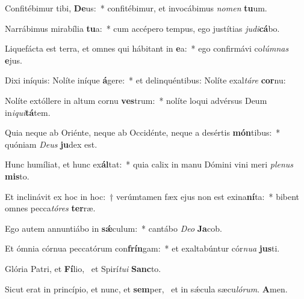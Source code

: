 \item Confitébimur tibi, \textbf{De}us:~* confitébimur, et invocábimus \textit{no}\textit{men} \textbf{tu}um.
\item Narrábimus mirabília \textbf{tu}a:~* cum accépero tempus, ego justítias \textit{ju}\textit{di}\textbf{cá}bo.
\item Liquefácta est terra, et omnes qui hábitant in \textbf{e}a:~* ego confirmávi co\textit{lúm}\textit{nas} \textbf{e}jus.
\item Dixi iníquis: Nolíte iníque \textbf{á}gere:~* et delinquéntibus: Nolíte exal\textit{tá}\textit{re} \textbf{cor}nu:
\item Nolíte extóllere in altum cornu \textbf{ves}trum:~* nolíte loqui advérsus Deum in\textit{i}\textit{qui}\textbf{tá}tem.
\item Quia neque ab Oriénte, neque ab Occidénte, neque a desértis \textbf{món}tibus:~* quóniam \textit{De}\textit{us} \textbf{ju}dex est.
\item Hunc humíliat, et hunc ex\textbf{ál}tat:~* quia calix in manu Dómini vini meri \textit{ple}\textit{nus} \textbf{mis}to.
\item Et inclinávit ex hoc in hoc:~† verúmtamen fæx ejus non est exina\textbf{ní}ta:~* bibent omnes pecca\textit{tó}\textit{res} \textbf{ter}ræ.
\item Ego autem annuntiábo in \textbf{sǽ}culum:~* cantábo \textit{De}\textit{o} \textbf{Ja}cob.
\item Et ómnia córnua peccatórum con\textbf{frín}gam:~* et exaltabúntur cór\textit{nu}\textit{a} \textbf{jus}ti.
\item Glória Patri, et \textbf{Fí}lio,~\psstar{} et Spirí\textit{tu}\textit{i} \textbf{Sanc}to.
\item Sicut erat in princípio, et nunc, et \textbf{sem}per,~\psstar{} et in sǽcula sæcu\textit{ló}\textit{rum}. \textbf{A}men.
